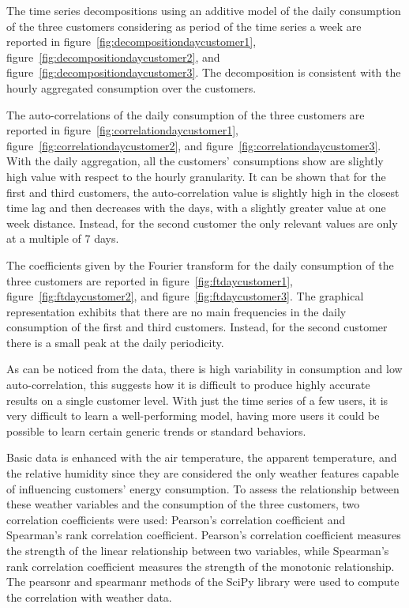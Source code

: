 The time series decompositions using an additive model of the daily consumption of the three customers considering as period of the time series a week are reported in figure~\ref{fig:decompositiondaycustomer1}, figure~\ref{fig:decompositiondaycustomer2}, and figure~\ref{fig:decompositiondaycustomer3}.
The decomposition is consistent with the hourly aggregated consumption over the customers.

The auto-correlations of the daily consumption of the three customers are reported in figure~\ref{fig:correlationdaycustomer1},  figure~\ref{fig:correlationdaycustomer2}, and  figure~\ref{fig:correlationdaycustomer3}.
With the daily aggregation, all the customers’ consumptions show are slightly high value with respect to the hourly granularity.
It can be shown that for the first and third customers, the auto-correlation value is slightly high in the closest time lag and then decreases with the days, with a slightly greater value at one week distance.
Instead, for the second customer the only relevant values are only at a multiple of 7 days.

The coefficients given by the Fourier transform for the daily consumption of the three customers are reported in figure~\ref{fig:ftdaycustomer1}, figure~\ref{fig:ftdaycustomer2}, and figure~\ref{fig:ftdaycustomer3}.
The graphical representation exhibits that there are no main frequencies in the daily consumption of the first and third customers.
Instead, for the second customer there is a small peak at the daily periodicity.

As can be noticed from the data, there is high variability in consumption and low auto-correlation, this suggests how it is difficult to produce highly accurate results on a single customer level.
With just the time series of a few users, it is very difficult to learn a well-performing model, having more users it could be possible to learn certain generic trends or standard behaviors.

Basic data is enhanced with the air temperature, the apparent temperature, and the relative humidity since they are considered the only weather features capable of influencing customers' energy consumption.
To assess the relationship between these weather variables and the consumption of the three customers, two correlation coefficients were used: Pearson's correlation coefficient and Spearman's rank correlation coefficient.
Pearson's correlation coefficient measures the strength of the linear relationship between two variables, while Spearman's rank correlation coefficient measures the strength of the monotonic relationship.
The pearsonr and spearmanr methods of the SciPy library were used to compute the correlation with weather data.

